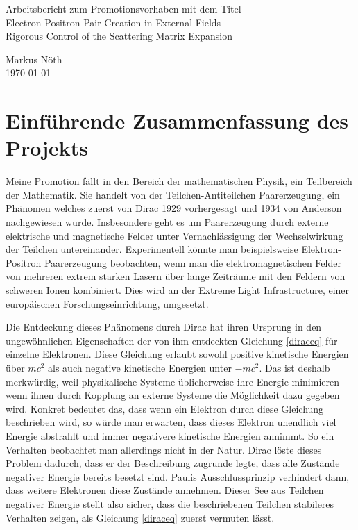 \documentclass[a4paper,12pt]{article}
\begin{document}
\begin{center}
{\huge Arbeitsbericht zum Promotionsvorhaben mit dem Titel
\\
{\Large Electron-Positron Pair Creation in External Fields \\
Rigorous Control of the Scattering Matrix Expansion}}
\end{center}

\begin{center}
Markus Nöth
\\ \today
\end{center}

\section{Einführende Zusammenfassung des Projekts}
Meine Promotion fällt in den Bereich der mathematischen Physik, ein Teilbereich der Mathematik. Sie handelt von der 
Teilchen-Antiteilchen Paarerzeugung, ein Phänomen welches zuerst von Dirac 1929 vorhergesagt und 1934 von 
Anderson nachgewiesen wurde. Insbesondere geht es um Paarerzeugung durch externe elektrische und 
magnetische Felder unter Vernachlässigung der Wechselwirkung der Teilchen untereinander. Experimentell könnte
man beispielsweise Elektron-Positron Paarerzeugung beobachten, wenn man die elektromagnetischen Felder von
mehreren extrem starken Lasern über lange Zeiträume mit den Feldern von schweren Ionen kombiniert. 
Dies wird an der Extreme Light Infrastructure, einer europäischen Forschungseinrichtung, umgesetzt. 

Die Entdeckung dieses Phänomens durch Dirac hat ihren Ursprung in den ungewöhnlichen Eigenschaften der von ihm
entdeckten Gleichung \eqref{diraceq} für einzelne Elektronen.
Diese Gleichung erlaubt sowohl positive kinetische 
Energien über \(m c^2\) als auch negative kinetische Energien unter \(-mc^2\). Das ist deshalb merkwürdig, weil
physikalische Systeme üblicherweise ihre Energie minimieren wenn ihnen durch Kopplung an externe Systeme
die Möglichkeit dazu gegeben wird. Konkret bedeutet das, dass wenn ein Elektron durch diese Gleichung beschrieben
wird, so würde man erwarten,
dass dieses Elektron unendlich viel Energie abstrahlt und immer negativere kinetische Energien annimmt. So ein Verhalten
beobachtet man allerdings nicht in der Natur. Dirac löste dieses Problem dadurch, dass er 
der Beschreibung zugrunde legte, dass alle Zustände negativer Energie bereits besetzt sind. Paulis Ausschlussprinzip 
verhindert dann, dass weitere Elektronen diese Zustände annehmen. Dieser See aus Teilchen negativer Energie stellt
also sicher, dass die beschriebenen Teilchen stabileres Verhalten zeigen, als Gleichung \eqref{diraceq} zuerst vermuten lässt.
\end{document}
